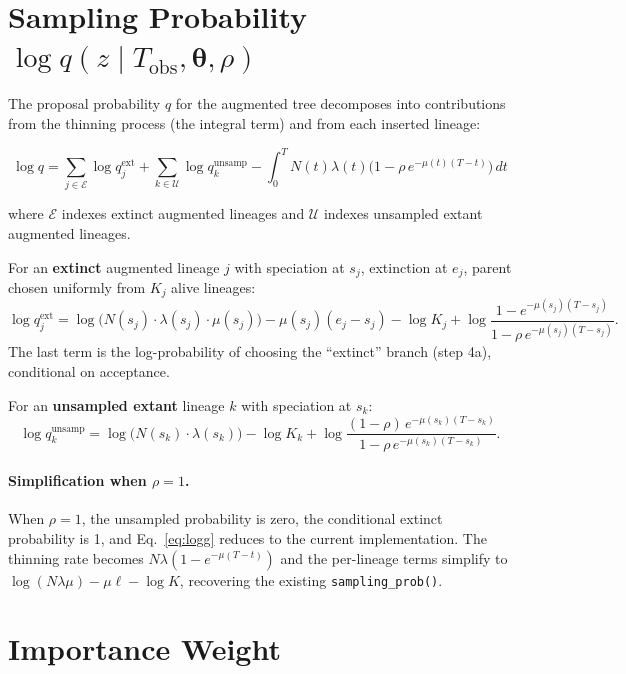 \documentclass[11pt]{article}
\newcommand{\btheta}{\boldsymbol{\theta}}
\newcommand{\Tobs}{T_{\mathrm{obs}}}
\begin{document}
\section{Sampling Probability $\log q(z \mid \Tobs, \btheta, \rho)$}

The proposal probability $q$ for the augmented tree decomposes into contributions from the thinning process (the integral term) and from each inserted lineage:

\begin{equation}\label{eq:logg}
\log q = \sum_{j \in \mathcal{E}} \log q_j^{\mathrm{ext}} + \sum_{k \in \mathcal{U}} \log q_k^{\mathrm{unsamp}} - \int_0^T N(t) \lambda(t) \bigl(1 - \rho\, e^{-\mu(t)(T-t)}\bigr) \, dt
\end{equation}

where $\mathcal{E}$ indexes extinct augmented lineages and $\mathcal{U}$ indexes unsampled extant augmented lineages.

For an \textbf{extinct} augmented lineage $j$ with speciation at $s_j$, extinction at $e_j$, parent chosen uniformly from $K_j$ alive lineages:
\begin{equation}
\log q_j^{\mathrm{ext}} = \log\bigl(N(s_j) \cdot \lambda(s_j) \cdot \mu(s_j)\bigr) - \mu(s_j)(e_j - s_j) - \log K_j + \log \frac{1 - e^{-\mu(s_j)(T-s_j)}}{1 - \rho\, e^{-\mu(s_j)(T-s_j)}}.
\end{equation}
The last term is the log-probability of choosing the ``extinct'' branch (step 4a), conditional on acceptance.

For an \textbf{unsampled extant} lineage $k$ with speciation at $s_k$:
\begin{equation}
\log q_k^{\mathrm{unsamp}} = \log\bigl(N(s_k) \cdot \lambda(s_k)\bigr) - \log K_k + \log \frac{(1-\rho)\, e^{-\mu(s_k)(T-s_k)}}{1 - \rho\, e^{-\mu(s_k)(T-s_k)}}.
\end{equation}

\paragraph{Simplification when $\rho = 1$.} When $\rho = 1$, the unsampled probability is zero, the conditional extinct probability is 1, and Eq.~\eqref{eq:logg} reduces to the current implementation. The thinning rate becomes $N\lambda(1 - e^{-\mu(T-t)})$ and the per-lineage terms simplify to $\log(N\lambda\mu) - \mu\ell - \log K$, recovering the existing \texttt{sampling\_prob()}.

\section{Importance Weight}
\end{document}
